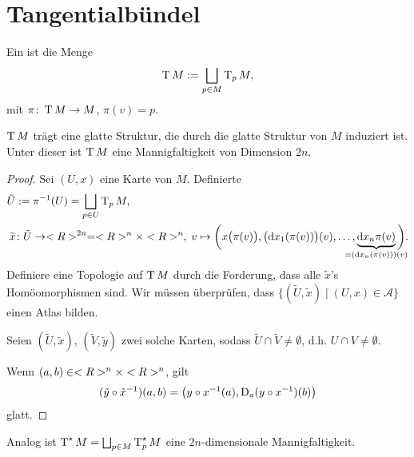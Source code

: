 \section{Tangentialbündel}
\begin{definition}
	Ein  ist die Menge \begin{align*}
		\operatorname{T} M := \bigsqcup_{p\in M} \operatorname{T}_p M,
	\end{align*}
	mit $\pi\colon \operatorname{T} M \to M$, $\pi(v) = p$.
\end{definition}
\begin{proposition}
	$\operatorname{T} M$ trägt eine glatte Struktur, die durch die glatte Struktur von $M$ induziert ist. Unter dieser ist $\operatorname{T} M$ eine Mannigfaltigkeit von Dimension $2n$.
\end{proposition}
\begin{proof}
	Sei $(U,x)$ eine Karte von $M$. Definierte \begin{align*}
		\tilde U &:= \pi^{-1}(U) = \bigsqcup_{p\in U} \T_p M,\\
		\tilde x&\colon \tilde U\to \R^{2n} = \R^n\times \R^n,\;v\mapsto \bigg( x\big(\pi(v)\big),\big(\mathrm dx_1(\pi(v))\big)(v),\dots,\underbrace{\mathrm dx_n\pi(v)}_{\mathclap{=(\mathrm dx_n (\pi(v)))(v)}}\bigg).
	\end{align*}
	Definiere eine Topologie auf $\operatorname{T} M$ durch die Forderung, dass alle $\tilde x$'s Homöomorphismen sind. Wir müssen überprüfen, dass $\{(\tilde U,\tilde x)\mid (U,x)\in\mathcal A\}$ einen Atlas bilden.
	
	Seien $(\tilde U,\tilde x)$, $(\tilde V,\tilde y)$ zwei solche Karten, sodass $\tilde U\cap \tilde V\neq \emptyset$, d.h. $U\cap V\neq\emptyset$.
	
	Wenn $(a,b)\in<R>^n\times <R>^n$, gilt \begin{align*}
		(\tilde y\circ\tilde x^{-1})(a,b) = \big( y\circ x^{-1}(a),\operatorname{D}_a(y\circ x^{-1})(b)\big)
	\end{align*}
	glatt.
\end{proof}

\begin{remark}
	Analog ist $\operatorname{T}^\star M = \bigsqcup_{p\in M} \operatorname{T}^\star_p M$ eine $2n$-dimensionale Mannigfaltigkeit.
\end{remark}

